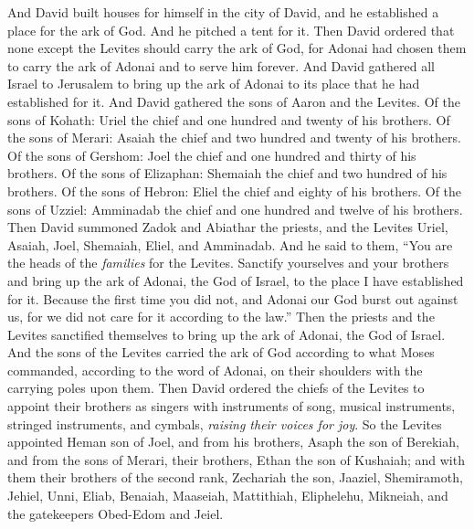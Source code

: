 \begin{biblechapter} %
 And David built houses for himself in the city of David, and he established a place for the ark of God. And he pitched a tent for it.
\verse Then David ordered that none except the Levites should carry the ark of God, for Adonai had chosen them to carry the ark of Adonai and to serve him forever.
\verse And David gathered all Israel to Jerusalem to bring up the ark of Adonai to its place that he had established for it.
\verse And David gathered the sons of Aaron and the Levites.
\verse Of the sons of Kohath: Uriel the chief and one hundred and twenty of his brothers.
\verse Of the sons of Merari: Asaiah the chief and two hundred and twenty of his brothers.
\verse Of the sons of Gershom: Joel the chief and one hundred and thirty of his brothers.
\verse Of the sons of Elizaphan: Shemaiah the chief and two hundred of his brothers.
\verse Of the sons of Hebron: Eliel the chief and eighty of his brothers.
\verse Of the sons of Uzziel: Amminadab the chief and one hundred and twelve of his brothers.
\verse Then David summoned Zadok and Abiathar the priests, and the Levites Uriel, Asaiah, Joel, Shemaiah, Eliel, and Amminadab.
\verse And he said to them, “You are the heads of the \textit{families} for the Levites. Sanctify yourselves and your brothers and bring up the ark of Adonai, the God of Israel, to the place I have established for it.
\verse Because the first time you did not, and Adonai our God burst out against us, for we did not care for it according to the law.”
\verse Then the priests and the Levites sanctified themselves to bring up the ark of Adonai, the God of Israel.
\verse And the sons of the Levites carried the ark of God according to what Moses commanded, according to the word of Adonai, on their shoulders with the carrying poles upon them.
\verse Then David ordered the chiefs of the Levites to appoint their brothers as singers with instruments of song, musical instruments, stringed instruments, and cymbals, \textit{raising their voices for joy}.
\verse So the Levites appointed Heman son of Joel, and from his brothers, Asaph the son of Berekiah, and from the sons of Merari, their brothers, Ethan the son of Kushaiah;
\verse and with them their brothers of the second rank, Zechariah the son, Jaaziel, Shemiramoth, Jehiel, Unni, Eliab, Benaiah, Maaseiah, Mattithiah, Eliphelehu, Mikneiah, and the gatekeepers Obed-Edom and Jeiel.

\end{biblechapter}
